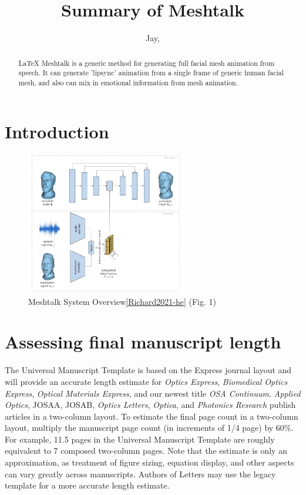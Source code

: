 \documentclass{osa-article}
\begin{document}
\title{Summary of Meshtalk}

\author{Jay,}

\address{
  Jay from CAU EAI Lab
  }




\begin{abstract}
\LaTeX{} Meshtalk is a generic method for generating full facial mesh animation from speech. It can generate 'lipsync' animation from a single frame of generic human facial mesh, and also can mix in emotional information from mesh animation.
\end{abstract}

\section{Introduction}
\begin{figure}[h!]
\centering\includegraphics[width=7cm]{meshtalk_overview.png}
\caption{Meshtalk System Overview\ref{Richard2021-he} (Fig. 1)}
\end{figure}


\section{Assessing final manuscript length}
The Universal Manuscript Template is based on the Express journal layout and will provide an accurate length estimate for \emph{Optics Express}, \emph{Biomedical Optics Express},  \emph{Optical Materials Express}, and our newest title \emph{OSA Continuum}. \emph{Applied Optics}, JOSAA, JOSAB, \emph{Optics Letters}, \emph{Optica}, and \emph{Photonics Research} publish articles in a two-column layout. To estimate the final page count in a two-column layout, multiply the manuscript page count (in increments of 1/4 page) by 60\%. For example, 11.5 pages in the Universal Manuscript Template are roughly equivalent to 7 composed two-column pages. Note that the estimate is only an approximation, as treatment of figure sizing, equation display, and other aspects can vary greatly across manuscripts. Authors of Letters may use the legacy template for a more accurate length estimate.
\end{document}
